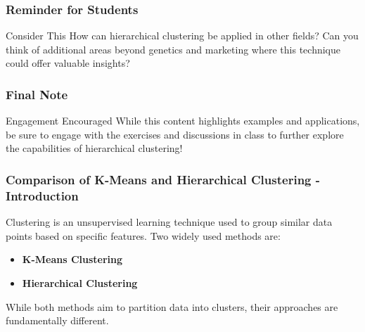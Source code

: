 \documentclass[aspectratio=169]{beamer}
\begin{document}
\begin{frame}[fragile]
    \frametitle{Reminder for Students}
    \begin{block}{Consider This}
        How can hierarchical clustering be applied in other fields? Can you think of additional areas beyond genetics and marketing where this technique could offer valuable insights?
    \end{block}
\end{frame}

\begin{frame}[fragile]
    \frametitle{Final Note}
    \begin{block}{Engagement Encouraged}
        While this content highlights examples and applications, be sure to engage with the exercises and discussions in class to further explore the capabilities of hierarchical clustering!
    \end{block}
\end{frame}

\begin{frame}[fragile]
    \frametitle{Comparison of K-Means and Hierarchical Clustering - Introduction}

    Clustering is an unsupervised learning technique used to group similar data points based on specific features. 
    Two widely used methods are:
    
    \begin{itemize}
        \item \textbf{K-Means Clustering}
        \item \textbf{Hierarchical Clustering}
    \end{itemize}
    
    While both methods aim to partition data into clusters, their approaches are fundamentally different.
\end{frame}
\end{document}
